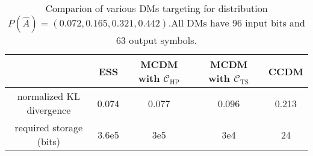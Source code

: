\begin{table*}[t]
\caption{Comparion of various DMs targeting for distribution \\ $P(\hat{A})=(0.072,0.165,0.321,0.442)$.All DMs have 96 input bits and 63 output symbols.}
\centering
\label{tab: dm_comp}
\begin{tabular}{|c|c|c|c|c|}
\hline
 & ESS & MCDM with $\mathcal{C}_{\mathrm{HP}}$ & MCDM with $\mathcal{C}_{\mathrm{TS}}$ & CCDM   \\ \hline
normalized KL divergence & 0.074              & 0.077                                                           & 0.096                                                            & 0.213 \\ \hline
required storage (bits)  & 3.6e5               & 3e5                                                              & 3e4                                                               & 24     \\ \hline
\end{tabular}
\end{table*}